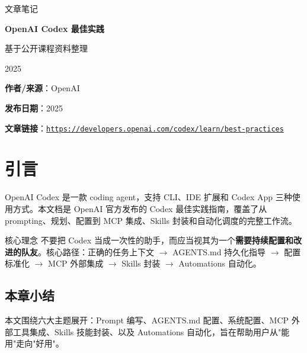 \documentclass[a4paper]{article}
\newcommand{\notetitle}{OpenAI Codex 最佳实践}
\newcommand{\noteauthors}{基于公开课程资料整理}
\newcommand{\notedate}{2025}
\newcommand{\videochannel}{OpenAI}
\newcommand{\videopublishdate}{2025}
\newcommand{\videourl}{https://developers.openai.com/codex/learn/best-practices}
\begin{document}
\begin{titlepage}
\centering
{\Large 文章笔记\par}
\vspace{1.2cm}
{\huge\bfseries \notetitle\par}
\vspace{0.8cm}
{\large \noteauthors\par}
\vspace{0.3cm}
{\large \notedate\par}
\vspace{1.5cm}

\vfill
\begin{tcolorbox}[width=0.9\textwidth, colback=black!2!white, colframe=black!60, sharp corners]
\textbf{作者/来源}：\videochannel\par
\textbf{发布日期}：\videopublishdate\par
\textbf{文章链接}：\href{\videourl}{\nolinkurl{\videourl}}
\end{tcolorbox}
\end{titlepage}

\tableofcontents
\newpage


\section{引言}

OpenAI Codex 是一款 coding agent，支持 CLI、IDE 扩展和 Codex App 三种使用方式。本文档是 OpenAI 官方发布的 Codex 最佳实践指南，覆盖了从 prompting、规划、配置到 MCP 集成、Skills 封装和自动化调度的完整工作流。

\begin{importantbox}{核心理念}
不要把 Codex 当成一次性的助手，而应当视其为一个\textbf{需要持续配置和改进的队友}。核心路径：正确的任务上下文 $\rightarrow$ AGENTS.md 持久化指导 $\rightarrow$ 配置标准化 $\rightarrow$ MCP 外部集成 $\rightarrow$ Skills 封装 $\rightarrow$ Automations 自动化。
\end{importantbox}

\subsection{本章小结}

本文围绕六大主题展开：Prompt 编写、AGENTS.md 配置、系统配置、MCP 外部工具集成、Skills 技能封装、以及 Automations 自动化，旨在帮助用户从"能用"走向"好用"。

\end{document}
